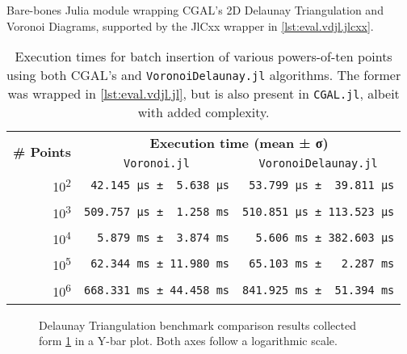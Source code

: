 \begin{listing}[htb]
  \inputminted{julia}{jl/Voronoi.jl}
  \caption[Bare-bones Julia module wrapping CGAL's Delaunay algorithms]{
    Bare-bones Julia module wrapping \ac{CGAL}'s 2D Delaunay Triangulation and
    Voronoi Diagrams, supported by the JlCxx wrapper in
    \cref{lst:eval.vdjl.jlcxx}.}%
  \label{lst:eval.vdjl.jl}
\end{listing}

\begin{table}[htb]
  \caption[Delaunay Triangulation batch insertion benchmark]{
    Execution times for batch insertion of various powers-of-ten points using
    both \ac{CGAL}'s and \texttt{VoronoiDelaunay.jl} algorithms.  The former was
    wrapped in \cref{lst:eval.vdjl.jl}, but is also present in \texttt{CGAL.jl},
    albeit with added complexity.}%
  \label{tab:eval.vdjl.bench}
  \centering
  \begin{tabular}{r*{2}{l}}
    \toprule
    \multirow{2}{*}{\textbf{\# Points}}
    & \multicolumn{2}{c}{\textbf{Execution time (mean ± σ)}} \\
    & \multicolumn{1}{c}{\texttt{Voronoi.jl}}
    & \multicolumn{1}{c}{\texttt{VoronoiDelaunay.jl}} \\
    \midrule
    10\textsuperscript{2} & \verb| 42.145 μs ±  5.638 μs| & \verb| 53.799 μs ±  39.811 μs| \\
    10\textsuperscript{3} & \verb|509.757 μs ±  1.258 ms| & \verb|510.851 μs ± 113.523 μs| \\
    10\textsuperscript{4} & \verb|  5.879 ms ±  3.874 ms| & \verb|  5.606 ms ± 382.603 μs| \\
    10\textsuperscript{5} & \verb| 62.344 ms ± 11.980 ms| & \verb| 65.103 ms ±   2.287 ms| \\
    10\textsuperscript{6} & \verb|668.331 ms ± 44.458 ms| & \verb|841.925 ms ±  51.394 ms| \\
    \bottomrule
  \end{tabular}
\end{table}

\begin{figure}[htb]
  \centering
  \caption[Delaunay Triangulation comparison plot]{
    Delaunay Triangulation benchmark comparison results collected form
    \cref{tab:eval.vdjl.bench} in a Y-bar plot.  Both axes follow a logarithmic
    scale.}%
  \label{fig:eval.vdjl.bench}
\end{figure}
